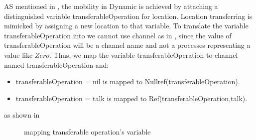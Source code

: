 AS mentioned in , the mobility in Dynamic \oz{} is achieved
by attaching a distinguished variable transferableOperation for location. Location transferring
is mimicked by assigning a new location to that variable. To translate the variable transferableOperation into \picalc{} we cannot use \picalc{} channel as in , since the value of transferableOperation will be a channel name and not a processes representing a value like $Zero$. Thus, we map the variable transferableOperation to channel named transferableOperation and:

\begin{itemize}
\item transferableOperation = nil is mapped to Nullref(transferableOperation).

\item transferableOperation = talk is mapped to Ref(transferableOperation,talk).
\end{itemize}
as shown in  

\begin{figure}[H]%
\centering
{}%
\hspace{\fill}
\hspace{1em}%
%
\caption{mapping transferable operation's variable}
\label{tra_ref}%
\end{figure}

